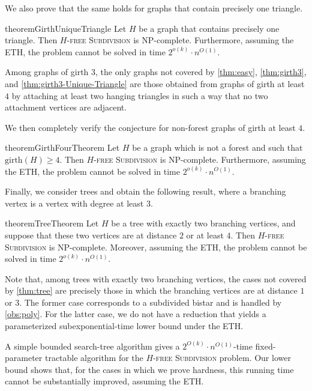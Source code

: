 \documentclass[a4paper,UKenglish,cleveref, autoref, thm-restate]{lipics-v2021}
\newcommand{\girth}{\mathrm{girth}}
\begin{document}
We also prove that the same holds for graphs that contain precisely one triangle.

\begin{restatable}{theorem}{GirthUniqueTriangle}
\label{thm:girth3-Unique-Triangle}
Let $H$ be a graph that contains precisely one triangle.
Then \textsc{$H$-free Subdivision} is NP-complete.
Furthermore, assuming the ETH, the problem cannot be solved in time
$2^{o(k)}\cdot n^{O(1)}$.
\end{restatable}

Among graphs of girth $3$, the only graphs not covered by \cref{thm:easy}, \cref{thm:girth3}, and \cref{thm:girth3-Unique-Triangle} are those obtained from graphs of girth at least $4$ by attaching at least two hanging triangles in such a way that no two attachment vertices are adjacent.

We then completely verify the conjecture for non-forest graphs of girth at least $4$.

\begin{restatable}{theorem}{GirthFourTheorem}
\label{thm:girth-4}
Let $H$ be a graph which is not a forest and such that $\girth(H)\geq 4$.
Then \textsc{$H$-free Subdivision} is NP-complete.
Furthermore, assuming the ETH, the problem cannot be solved in time
$2^{o(k)}\cdot n^{O(1)}$.
\end{restatable}

Finally, we consider trees and obtain the following result, where a branching vertex is a vertex with degree at least 3.

\begin{restatable}{theorem}{TreeTheorem}
\label{thm:tree}
Let $H$ be a tree with exactly two branching vertices, and suppose that these two vertices are at distance $2$ or at least $4$.
Then \textsc{$H$-free Subdivision} is NP-complete.
Moreover, assuming the ETH, the problem cannot be solved in time
$2^{o(k)}\cdot n^{O(1)}$.
\end{restatable}
Note that, among trees with exactly two branching vertices, the cases not covered by \cref{thm:tree} are precisely those in which the branching vertices are at distance $1$ or $3$.
The former case corresponds to a subdivided bistar and is handled by \cref{obs:poly}.
For the latter case, we do not have a reduction that yields a parameterized subexponential-time lower bound under the ETH.

A simple bounded search-tree algorithm gives a
$2^{O(k)}\cdot n^{O(1)}$-time fixed-parameter tractable algorithm for the \textsc{$H$-free Subdivision} problem.
Our lower bound shows that, for the cases in which we prove hardness, this running time cannot be substantially improved, assuming the ETH.
\end{document}
